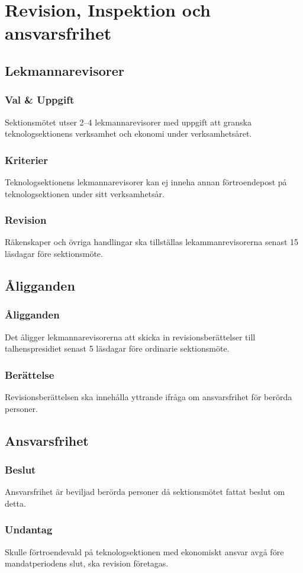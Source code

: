 \section{Revision, Inspektion och ansvarsfrihet}
\subsection{Lekmannarevisorer}
\subsubsection{Val \& Uppgift}
Sektionsmötet utser 2–4 lekmannarevisorer med uppgift att granska teknologsektionens verksamhet och ekonomi under verksamhetsåret.
\subsubsection{Kriterier}
Teknologsektionens lekmannarevisorer kan ej inneha annan förtroendepost på teknologsektionen under sitt verksamhetsår.
\subsubsection{Revision}
Räkenskaper och övriga handlingar ska tillställas lekammanrevisorerna senast 15 läsdagar före sektionsmöte.
\subsection{Åligganden}
\subsubsection{Åligganden}
Det åligger lekmannarevisorerna att skicka in revisionsberättelser till talhenspresidiet senast 5 läsdagar före ordinarie sektionsmöte.
\subsubsection{Berättelse}
Revisionsberättelsen ska innehålla yttrande ifråga om ansvarsfrihet för berörda personer.
\subsection{Ansvarsfrihet}
\subsubsection{Beslut}
Ansvarsfrihet är beviljad berörda personer då sektionsmötet fattat beslut om detta.
\subsubsection{Undantag}
Skulle förtroendevald på teknologsektionen med ekonomiskt ansvar avgå före mandatperiodens slut, ska revision företagas.
